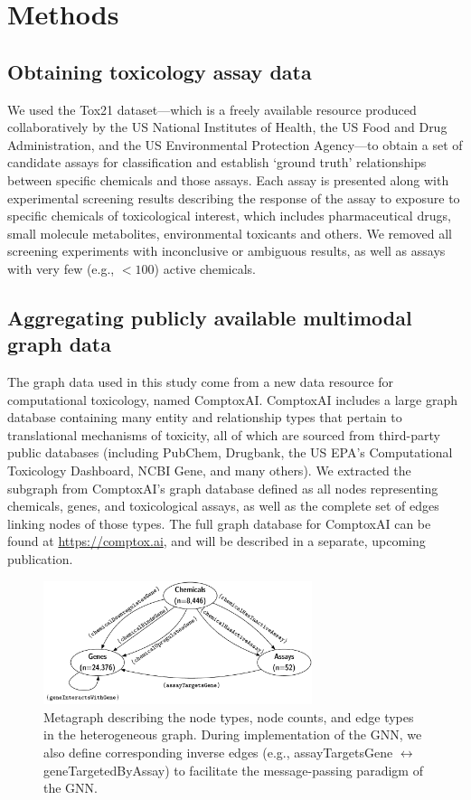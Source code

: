 \documentclass{ws-procs11x85}
\begin{document}
\section{Methods}

\subsection{Obtaining toxicology assay data}
We used the Tox21 dataset---which is a freely available resource produced collaboratively by the US National Institutes of Health, the US Food and Drug Administration, and the US Environmental Protection Agency---to obtain a set of candidate assays for classification and establish `ground truth' relationships between specific chemicals and those assays.
Each assay is presented along with experimental screening results describing the response of the assay to exposure to specific chemicals of toxicological interest, which includes pharmaceutical drugs, small molecule metabolites, environmental toxicants and others.
We removed all screening experiments with inconclusive or ambiguous results, as well as assays with very few (e.g., $<100$) active chemicals.

\subsection{Aggregating publicly available multimodal graph data}
The graph data used in this study come from a new data resource for computational toxicology, named ComptoxAI.
ComptoxAI includes a large graph database containing many entity and relationship types that pertain to translational mechanisms of toxicity, all of which are sourced from third-party public databases (including PubChem, Drugbank, the US EPA's Computational Toxicology Dashboard, NCBI Gene, and many others).
We extracted the subgraph from ComptoxAI's graph database defined as all nodes representing chemicals, genes, and toxicological assays, as well as the complete set of edges linking nodes of those types.
The full graph database for ComptoxAI can be found at \url{https://comptox.ai}, and will be described in a separate, upcoming publication.

\begin{figure}
   \centering
   \includegraphics[width=0.7\textwidth]{figures/figure1-1.pdf}
   \caption{Metagraph describing the node types, node counts, and edge types in the heterogeneous graph. During implementation of the GNN, we also define corresponding inverse edges (e.g., assayTargetsGene $\leftrightarrow$ geneTargetedByAssay) to facilitate the message-passing paradigm of the GNN.}\label{fig:2}
\end{figure}
\end{document}
